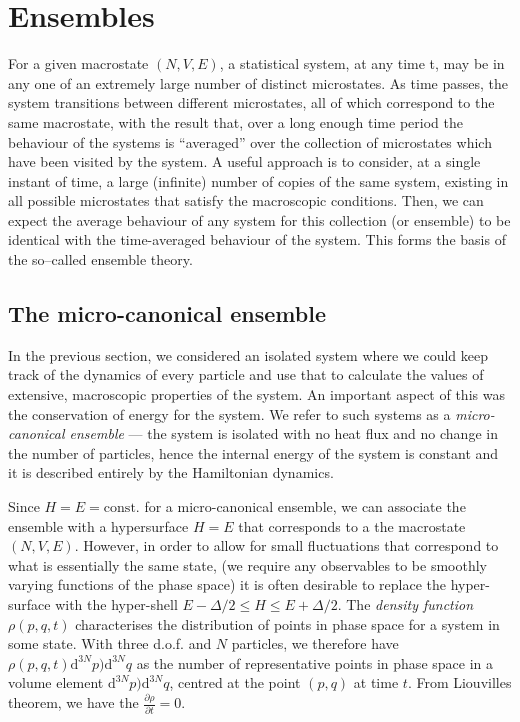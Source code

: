 \section{Ensembles}

For a given macrostate $(N, V, E)$, a statistical system, at any time t, may be in any one of an extremely large number of distinct microstates. As time passes, the system transitions between different microstates, all of which correspond to the same macrostate, with the result that, over a long enough time period the behaviour of the systems is ``averaged'' over the collection of microstates which have been visited by the system.
A useful approach is to consider, at a single instant of time, a large (infinite) number of copies of the same system, existing in all possible microstates that satisfy the macroscopic conditions. Then, we can expect the average behaviour of any system for this collection (or ensemble) to be identical with the time-averaged behaviour of the system. This forms the basis of the so–called ensemble theory.

\subsection{The micro-canonical ensemble}
In the previous section, we considered an isolated system where we could keep track of the dynamics of every particle and use that to calculate the values of extensive, macroscopic properties of the system. An important aspect of this was the conservation of energy for the system. We refer to such systems as a \emph{micro-canonical ensemble} --- the system is isolated with no heat flux and no change in the number of particles, hence the internal energy of the system is constant and it is described entirely by the Hamiltonian dynamics.

Since $H=E=\mbox{const.}$ for a micro-canonical ensemble, we can associate the ensemble with a hypersurface $H=E$ that corresponds to a the macrostate $(N,V,E)$. However, in order to allow for small fluctuations that correspond to what is essentially the same state, (we require any observables to be smoothly varying functions of the phase space) it is often desirable to replace the hyper-surface with the hyper-shell $E-\Delta/2 \leq H \leq E+\Delta/2$. The \emph{density function} $\rho(p,q,t)$ characterises the distribution of points in phase space for a system in some state. With three d.o.f. and $N$ particles, we therefore have $\rho(p,q,t)\mathrm{d}^{3N}p)\mathrm{d}^{3N}q$ as the number of representative points in phase space in a volume element $\mathrm{d}^{3N}p)\mathrm{d}^{3N}q$, centred at the point $(p,q)$ at time $t$. From Liouvilles theorem, we have the $\frac{\partial \rho}{\partial t}=0$. 


